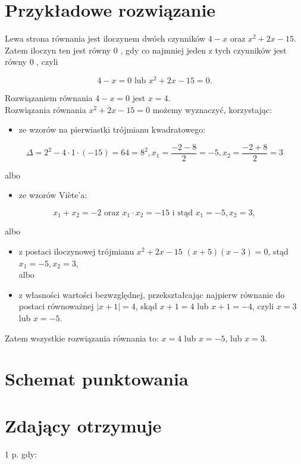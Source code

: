 \documentclass[10pt]{article}
\begin{document}
\section*{Przykładowe rozwiązanie}
Lewa strona równania jest iloczynem dwóch czynników $4-x$ oraz $x^{2}+2 x-15$. Zatem iloczyn ten jest równy 0 , gdy co najmniej jeden z tych czynników jest równy 0 , czyli

$$
4-x=0 \text { lub } x^{2}+2 x-15=0 .
$$

Rozwiązaniem równania $4-x=0$ jest $x=4$.\\
Rozwiązania równania $x^{2}+2 x-15=0$ możemy wyznaczyć, korzystając:

\begin{itemize}
  \item ze wzorów na pierwiastki trójmianu kwadratowego:
\end{itemize}

$$
\Delta=2^{2}-4 \cdot 1 \cdot(-15)=64=8^{2}, x_{1}=\frac{-2-8}{2}=-5, x_{2}=\frac{-2+8}{2}=3
$$

albo

\begin{itemize}
  \item ze wzorów Viète'a:
\end{itemize}

$$
x_{1}+x_{2}=-2 \text { oraz } x_{1} \cdot x_{2}=-15 \text { i stąd } x_{1}=-5, x_{2}=3,
$$

albo

\begin{itemize}
  \item z postaci iloczynowej trójmianu $x^{2}+2 x-15$ $(x+5)(x-3)=0$, stąd $x_{1}=-5, x_{2}=3$,\\
albo
  \item z własności wartości bezwzględnej, przekształcając najpierw równanie do postaci równoważnej $|x+1|=4$, skąd $x+1=4$ lub $x+1=-4$, czyli $x=3$ lub $x=-5$.
\end{itemize}

Zatem wszystkie rozwiązania równania to: $x=4$ lub $x=-5$, lub $x=3$.

\section*{Schemat punktowania}
\section*{Zdający otrzymuje}
1 p. gdy:
\end{document}
